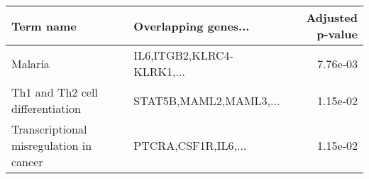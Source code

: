 \begin{tabular}{llr}
\toprule
                              Term name &      Overlapping genes... &  Adjusted p-value \\
\midrule
                                Malaria & IL6,ITGB2,KLRC4-KLRK1,... &          7.76e-03 \\
       Th1 and Th2 cell differentiation &    STAT5B,MAML2,MAML3,... &          1.15e-02 \\
Transcriptional misregulation in cancer &       PTCRA,CSF1R,IL6,... &          1.15e-02 \\
\bottomrule
\end{tabular}
